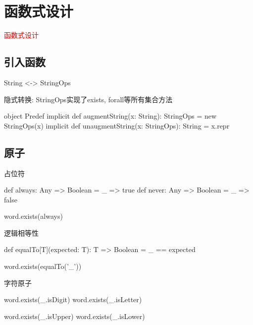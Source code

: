 \section{函数式设计}
\label{sec:fpdesign}

\begin{frame}
  \begin{center}
    \Huge{\textcolor{red}{函数式设计}}
  \end{center}
\end{frame}

\subsection{引入函数}

\begin{frame}[fragile]{String <-> StringOps}
 \begin{block}{隐式转换: StringOps实现了exists, forall等所有集合方法}
  \begin{scala}
object Predef {
  implicit def augmentString(x: String): StringOps = new StringOps(x)  
  implicit def unaugmentString(x: StringOps): String = x.repr
}
  \end{scala}
 \end{block}
\end{frame}

\subsection{原子}

\begin{frame}[fragile]{占位符}
  \begin{scala}
def always: Any => Boolean = _ => true
def never:  Any => Boolean = _ => false  

word.exists(always)
  \end{scala}
\end{frame}

\begin{frame}[fragile]{逻辑相等性}
  \begin{scala}
def equalTo[T](expected: T): T => Boolean = _ == expected

word.exists(equalTo('_'))
  \end{scala}
\end{frame}

\begin{frame}[fragile]{字符原子}
  \begin{scala}
word.exists(_.isDigit)
word.exists(_.isLetter)

word.exists(_.isUpper)
word.exists(_.isLower)
  \end{scala}
\end{frame}

